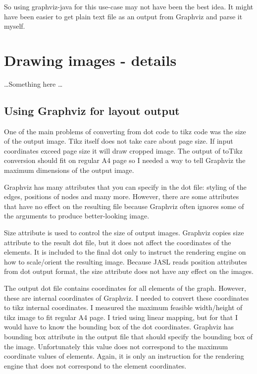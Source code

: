 \documentclass{ctuthesis}
\begin{document}
So using graphviz-java for this use-case may not have been the best idea. It might have been easier to get plain text file as an output from Graphviz and parse it myself. 

\chapter{Drawing images - details}

\ldots Something here \ldots


\section{Using Graphviz for layout output}
\label{sec:problems_graphviz}
One of the main problems of converting from dot code to tikz code was the size of the output image. Tikz itself does not take care about page size. If input coordinates exceed page size it will draw cropped image. The output of toTikz conversion should fit on regular A4 page so I needed a way to tell Graphviz the maximum dimensions of the output image. 

Graphviz has many attributes that you can specify in the dot file: styling of the edges, positions of nodes and many more. However, there are some attributes that have no effect on the resulting file because Graphviz often ignores some of the arguments to produce better-looking image.

Size attribute is used to control the size of output images. Graphviz copies size attribute to the result dot file, but it does not affect the coordinates of the elements. It is included to the final dot only to instruct the rendering engine on how to scale/orient the resulting image. Because JASL reads position attributes from dot output format, the size attribute does not have any effect on the images.

The output dot file contains coordinates for all elements of the graph. However, these are internal coordinates of Graphviz. I needed to convert these coordinates to tikz internal coordinates. I measured the maximum feasible width/height of tikz image to fit regular A4 page. I tried using linear mapping, but for that I would have to know the bounding box of the dot coordinates. Graphviz has bounding box attribute in the output file that should specify the bounding box of the image. Unfortunately this value does not correspond to the maximum coordinate values of elements. Again, it is only an instruction for the rendering engine that does not correspond to the element coordinates.
\end{document}
